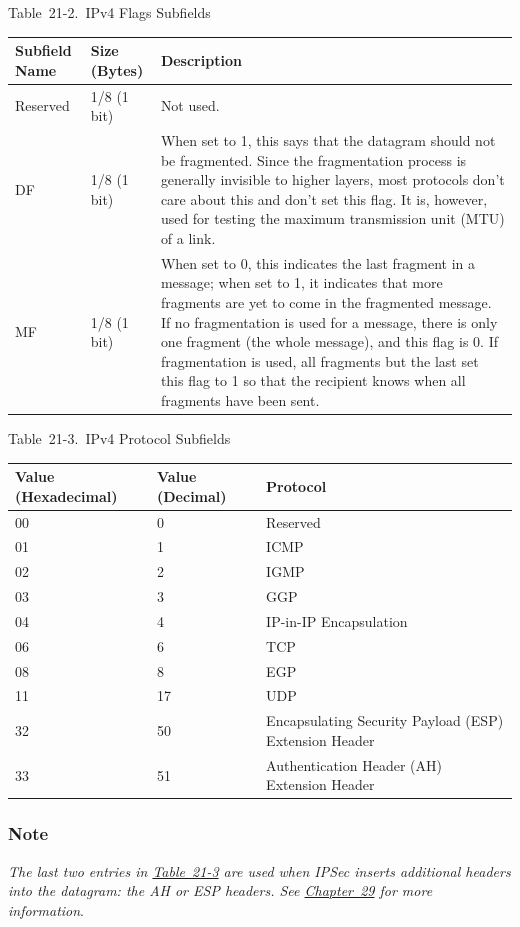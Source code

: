 Table~21-2.~IPv4 Flags Subfields

\begin{longtable}[]{@{}lll@{}}
\toprule
Subfield Name & Size (Bytes) & Description\tabularnewline
\midrule
\endhead
Reserved & 1/8 (1 bit) & Not used.\tabularnewline
DF & 1/8 (1 bit) & When set to 1, this says that the datagram should not
be fragmented. Since the fragmentation process is generally invisible to
higher layers, most protocols don't care about this and don't set this
flag. It is, however, used for testing the maximum transmission unit
(MTU) of a link.\tabularnewline
MF & 1/8 (1 bit) & When set to 0, this indicates the last fragment in a
message; when set to 1, it indicates that more fragments are yet to come
in the fragmented message. If no fragmentation is used for a message,
there is only one fragment (the whole message), and this flag is 0. If
fragmentation is used, all fragments but the last set this flag to 1 so
that the recipient knows when all fragments have been
sent.\tabularnewline
\bottomrule
\end{longtable}



Table~21-3.~IPv4 Protocol Subfields

\begin{longtable}[]{@{}lll@{}}
\toprule
Value (Hexadecimal) & Value (Decimal) & Protocol\tabularnewline
\midrule
\endhead
00 & 0 & Reserved\tabularnewline
01 & 1 & ICMP\tabularnewline
02 & 2 & IGMP\tabularnewline
03 & 3 & GGP\tabularnewline
04 & 4 & IP-in-IP Encapsulation\tabularnewline
06 & 6 & TCP\tabularnewline
08 & 8 & EGP\tabularnewline
11 & 17 & UDP\tabularnewline
32 & 50 & Encapsulating Security Payload (ESP) Extension
Header\tabularnewline
33 & 51 & Authentication Header (AH) Extension Header\tabularnewline
\bottomrule
\end{longtable}

\subsubsection[Note]{\texorpdfstring{Note}{Note}}

{\emph{The last two entries in
\protect\hyperlink{ch21s02.htmlux5cux23ipv_protocol_subfields}{Table~21-3}
are used when IPSec inserts additional headers into the datagram: the AH
or ESP headers. See \protect\hyperlink{ch29.html}{Chapter~29} for more
information}}.





